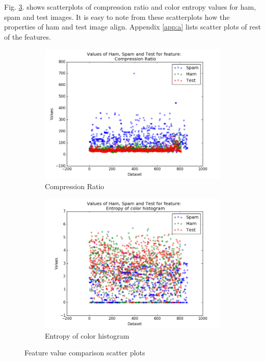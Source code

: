 \par Fig. \ref{fig:Scatter_Plots}. shows scatterplots of compression ratio and color entropy values for ham, spam and test images. It is easy to note from these scatterplots how the properties of ham and test image align. Appendix \ref{app:a} lists scatter plots of rest of the features.

 \begin{figure}[h]
 	
 	\begin{subfigure}{0.5\textwidth}
 		\includegraphics[width=0.9\linewidth]{images/CompressionRatio_values_scatter} 
 		\caption{Compression Ratio}
 		\label{fig:AUC_Dataset1_linear}
 	\end{subfigure}
 	\begin{subfigure}{0.5\textwidth}
 		\includegraphics[width=0.9\linewidth]{images/EntropyOfColorHistogram_values_scatter}
 		\caption{Entropy of color histogram}
 		\label{fig:CM_Dataset1_linear}
 	\end{subfigure}
 	
 	\caption{Feature value comparison scatter plots}
 	\label{fig:Scatter_Plots}
 \end{figure}
 





